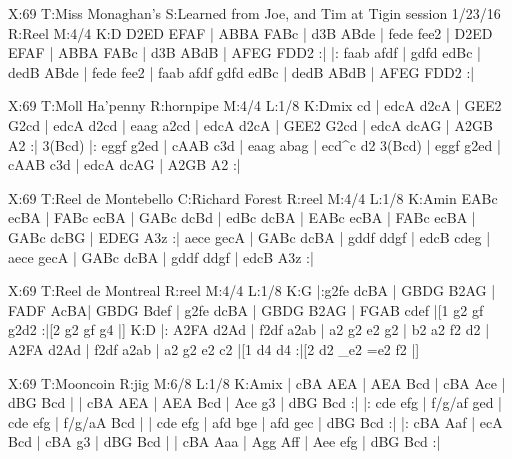\documentclass{article}
\begin{document}
\begin{abc}[name]
X:69
T:Miss Monaghan's
S:Learned from Joe, and Tim at Tigin session 1/23/16
R:Reel
M:4/4
K:D
D2ED EFAF | ABBA FABc | d3B ABde | fede fee2 |
D2ED EFAF | ABBA FABc | d3B ABdB | AFEG FDD2 :|
|: faab afdf | gdfd edBc | dedB ABde | fede fee2 |
faab afdf gdfd edBc | dedB ABdB | AFEG FDD2 :|
\end{abc}

\begin{abc}[name]
X:69
T:Moll Ha'penny
R:hornpipe
M:4/4
L:1/8
K:Dmix
cd | edcA d2cA | GEE2 G2cd | edcA d2cd | eaag a2cd |
edcA d2cA | GEE2 G2cd | edcA dcAG | A2GB A2 :|
3(Bcd) |: eggf g2ed | cAAB c3d | eaag abag | ecd^c d2 3(Bcd) |
eggf g2ed | cAAB c3d | edcA dcAG | A2GB A2 :|
\end{abc}

\begin{abc}[name]
X:69
T:Reel de Montebello
C:Richard Forest
R:reel
M:4/4
L:1/8
K:Amin
EABc ecBA | FABc ecBA | GABc dcBd | edBc dcBA |
EABc ecBA | FABc ecBA | GABc dcBG | EDEG A3z :|
aece gecA | GABc dcBA | gddf ddgf | edcB cdeg |
aece gecA | GABc dcBA | gddf ddgf | edcB A3z :|
\end{abc}

\begin{abc}[name]
X:69
T:Reel de Montreal
R:reel
M:4/4
L:1/8
K:G
|:g2fe dcBA | GBDG B2AG | FADF AcBA| GBDG Bdef |
g2fe dcBA | GBDG B2AG | FGAB cdef |[1 g2 gf g2d2 :|[2 g2 gf g4 |]
K:D
|: A2FA d2Ad | f2df a2ab | a2 g2 e2 g2 | b2 a2 f2 d2 |
A2FA d2Ad | f2df a2ab | a2 g2 e2 c2 |[1 d4 d4 :|[2 d2 _e2 =e2 f2 |]
\end{abc}

\begin{abc}[name]
X:69
T:Mooncoin
R:jig
M:6/8
L:1/8
K:Amix
| cBA AEA | AEA Bcd | cBA Ace | dBG Bcd |
| cBA AEA | AEA Bcd | Ace g3 | dBG Bcd :|
|: cde efg | f/g/af ged | cde efg | f/g/aA Bcd |
| cde efg | afd bge | afd gec | dBG Bcd :|
|: cBA Aaf | ecA Bcd | cBA g3 | dBG Bcd |
| cBA Aaa | Agg Aff | Aee efg | dBG Bcd :|
\end{abc}
\end{document}
